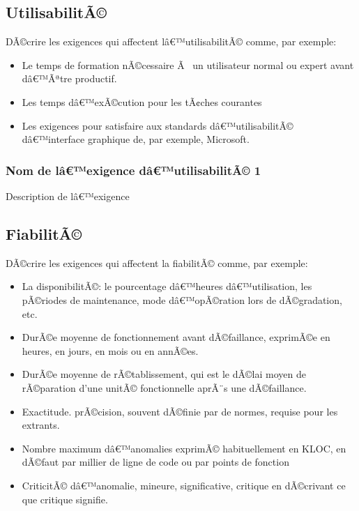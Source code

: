 \documentclass[a4paper, french, 10pt]{report}
\begin{document}
	\subsection{UtilisabilitÃ©} 
	DÃ©crire les exigences qui affectent lâ€™utilisabilitÃ© comme, par exemple:
	\begin{itemize}
		\item Le temps de formation nÃ©cessaire Ã  un utilisateur normal ou expert avant dâ€™Ãªtre productif.
		\item Les temps dâ€™exÃ©cution pour les tÃ¢ches courantes
		\item Les exigences pour satisfaire aux standards dâ€™utilisabilitÃ© dâ€™interface graphique de, par exemple, Microsoft.
	\end{itemize}
	
	\subsubsection{Nom de lâ€™exigence dâ€™utilisabilitÃ© 1}
	Description de lâ€™exigence 

	\subsection{FiabilitÃ© }
	
	DÃ©crire les exigences qui affectent la fiabilitÃ© comme, par exemple:
	\begin{itemize}

	\item	La disponibilitÃ©: le pourcentage dâ€™heures dâ€™utilisation, les pÃ©riodes de maintenance, mode dâ€™opÃ©ration lors de dÃ©gradation, etc.
	\item	DurÃ©e moyenne de fonctionnement avant dÃ©faillance, exprimÃ©e en heures, en jours, en mois ou en annÃ©es.
	\item	DurÃ©e moyenne de rÃ©tablissement, qui est le dÃ©lai moyen de rÃ©paration d'une unitÃ© fonctionnelle aprÃ¨s une dÃ©faillance.
	\item	Exactitude. prÃ©cision, souvent dÃ©finie par de normes, requise pour les extrants.
	\item	Nombre maximum dâ€™anomalies exprimÃ© habituellement en KLOC, en dÃ©faut par millier de ligne de code ou par points de fonction
	\item	CriticitÃ© dâ€™anomalie, mineure, significative, critique en dÃ©crivant ce que critique signifie. 
	 
	\end{itemize}
	
\end{document}
